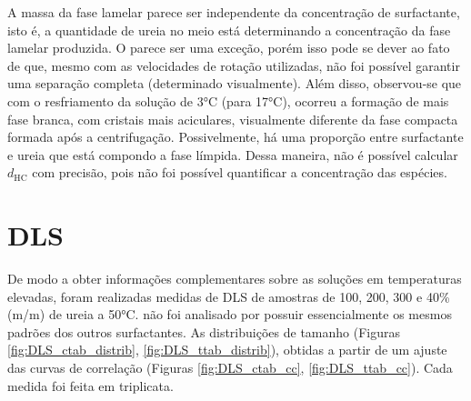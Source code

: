 	A massa da fase lamelar parece ser independente da concentração de surfactante, isto é, a quantidade de ureia no meio está determinando a concentração da fase lamelar produzida. O \CTAB{} parece ser uma exceção, porém isso pode se dever ao fato de que, mesmo com as velocidades de rotação utilizadas, não foi possível garantir uma separação completa (determinado visualmente). Além disso, observou-se que com o resfriamento da solução de 3°C (para 17°C), ocorreu a formação de mais fase branca, com cristais mais aciculares, visualmente diferente da fase compacta formada após a centrifugação. Possivelmente, há uma proporção entre surfactante e ureia que está compondo a fase límpida. Dessa maneira, não é possível calcular \(d_\mathrm{HC}\) com precisão, pois não foi possível quantificar a concentração das espécies. 
	\FloatBarrier
\section{DLS}
\label{sec:Ureia-DLS}

	De modo a obter informações complementares sobre as soluções em temperaturas elevadas, foram realizadas medidas de DLS de amostras de \CTTAB{} 100, 200, 300 \mM{} e 40\% (m/m) de ureia a 50°C. \DTAB{} não foi analisado por possuir essencialmente os mesmos padrões dos outros surfactantes. As distribuições de tamanho (Figuras \ref{fig:DLS_ctab_distrib}, \ref{fig:DLS_ttab_distrib}), obtidas a partir de um ajuste das curvas de correlação (Figuras \ref{fig:DLS_ctab_cc}, \ref{fig:DLS_ttab_cc}). Cada medida foi feita em triplicata.
	

